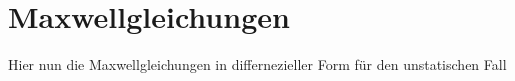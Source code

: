 \newpage
\section{Maxwellgleichungen}
Hier nun die Maxwellgleichungen in differnezieller Form für den unstatischen Fall

